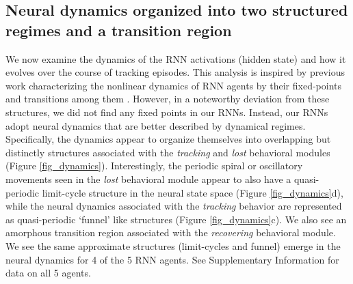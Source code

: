 \documentclass[5p,twocolumn,authoryear]{elsarticle}
\begin{document}
\subsection*{Neural dynamics organized into two structured regimes and a transition region}
\label{sec_dynamics}

We now examine the dynamics of the RNN activations (hidden state) and how it evolves over the course of tracking episodes.
This analysis is inspired by previous work characterizing the nonlinear dynamics of RNN agents by their fixed-points and transitions among them \citep{vyas2020computation, sussillo2013opening, maheswaranathan2019universality}.
However, in a noteworthy deviation from these structures, we did not find any fixed points in our RNNs. 
Instead, our RNNs adopt neural dynamics that are better described by dynamical regimes.
Specifically, the dynamics appear to organize themselves into overlapping but distinctly structures associated with the \textit{tracking} and \textit{lost} behavioral modules (Figure \ref{fig_dynamics}). 
Interestingly, the periodic spiral or oscillatory movements seen in the \textit{lost} behavioral module appear to also have a quasi-periodic limit-cycle structure in the neural state space (Figure \ref{fig_dynamics}d), while 
the neural dynamics associated with the \textit{tracking} behavior are represented as quasi-periodic `funnel' like structures (Figure \ref{fig_dynamics}c).
We also see an amorphous transition region associated with the \textit{recovering} behavioral module.
We see the same approximate structures (limit-cycles and funnel) emerge in the neural dynamics for 4 of the 5 RNN agents. 
See Supplementary Information for data on all 5 agents. 


\end{document}

